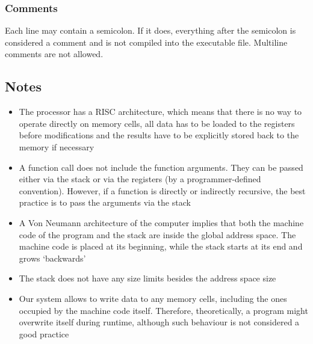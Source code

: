\subsubsection{Comments}

Each line may contain a semicolon.
If it does, everything after the semicolon is considered a comment and is not compiled into the executable file.
Multiline comments are not allowed.

\vspace{.4in}

\subsection{Notes}

\begin{itemize}
    \item The  processor has a RISC architecture, which means that there is no way to operate directly on memory cells, all data has to be loaded to the registers before modifications and the results have to be explicitly stored back to the memory if necessary
    \item A function call does not include the function arguments.
    They can be passed either via the stack or via the registers (by a programmer-defined convention).
    However, if a function is directly or indirectly recursive, the best practice is to pass the arguments via the stack
    \item A Von Neumann architecture of the  computer implies that both the machine code of the program and the stack are inside the global address space.
    The machine code is placed at its beginning, while the stack starts at its end and grows `backwards'
    \item The stack does not have any size limits besides the address space size
    \item Our system allows to write data to any memory cells, including the ones occupied by the machine code itself.
    Therefore, theoretically, a program might overwrite itself during runtime, although such behaviour is not considered a good practice
\end{itemize}
